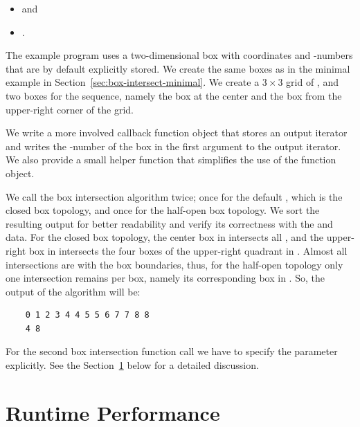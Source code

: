 \begin{itemize}
  \item {} and
  \item {}.
\end{itemize}

The example program uses a two-dimensional box with 
coordinates and -numbers that are by default explicitly
stored. We create the same boxes as in the minimal example in
Section~\ref{sec:box-intersect-minimal}. We create a $3 \times 3$ grid
of , and two boxes for the  sequence, namely the
box at the center and the box from the upper-right corner of the grid.

We write a more involved callback function object  that
stores an output iterator and writes the -number of the 
box in the first argument to the output iterator. We also provide a
small helper function  that simplifies the use of the function
object.

We call the box intersection algorithm twice; once for the default
, which is the closed box topology, and once for the
half-open box topology. We sort the resulting output for better
readability and verify its correctness with the  and
 data.  For the closed box topology, the center box in
 intersects all , and the upper-right box in
 intersects the four boxes of the upper-right quadrant in
. Almost all intersections are with the box boundaries,
thus, for the half-open topology only one intersection remains per
 box, namely its corresponding box in . So, the
output of the algorithm will be:

\begin{verbatim}
    0 1 2 3 4 4 5 5 6 7 7 8 8 
    4 8 
\end{verbatim}

For the second box intersection function call we have to specify the
 parameter explicitly. See the
Section~\ref{sec:box-inters-performance} below for a detailed
discussion.



\section{Runtime Performance}\label{sec:box-inters-performance}

